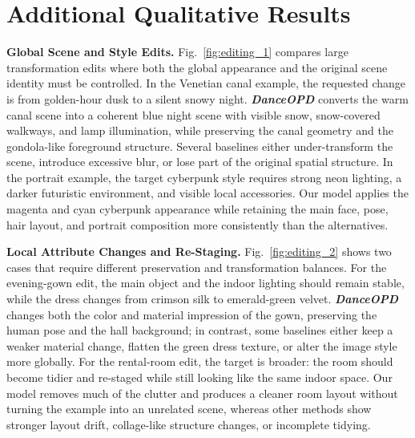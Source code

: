 \documentclass{llmxive}
\providecommand{\name}{\textsl{\textbf{DanceOPD}}\xspace}
\begin{document}
\begin{table}[!htbp]
\caption{\textbf{Timestep and Initialization Ablations.}
  Scores are GEditBench-EN sub-scores unless otherwise noted. Objective, teacher-schedule, dense-query, and rollout-control diagnostics are consolidated in Table~\ref{tab:multi-teacher-aggregation}. These ablations support semantic-side low-$t$ querying and the default initialization choice.}
\label{tab:ablation-summary}
\end{table}




\section{Additional Qualitative Results}
\label{app:additional-qualitative}

\noindent\textbf{Global Scene and Style Edits.}
Fig.~\ref{fig:editing_1} compares large transformation edits where both the global appearance and the original scene identity must be controlled. In the Venetian canal example, the requested change is from golden-hour dusk to a silent snowy night. \name{} converts the warm canal scene into a coherent blue night scene with visible snow, snow-covered walkways, and lamp illumination, while preserving the canal geometry and the gondola-like foreground structure. Several baselines either under-transform the scene, introduce excessive blur, or lose part of the original spatial structure. In the portrait example, the target cyberpunk style requires strong neon lighting, a darker futuristic environment, and visible local accessories. Our model applies the magenta and cyan cyberpunk appearance while retaining the main face, pose, hair layout, and portrait composition more consistently than the alternatives.


\noindent\textbf{Local Attribute Changes and Re-Staging.}
Fig.~\ref{fig:editing_2} shows two cases that require different preservation and transformation balances. For the evening-gown edit, the main object and the indoor lighting should remain stable, while the dress changes from crimson silk to emerald-green velvet. \name{} changes both the color and material impression of the gown, preserving the human pose and the hall background; in contrast, some baselines either keep a weaker material change, flatten the green dress texture, or alter the image style more globally. For the rental-room edit, the target is broader: the room should become tidier and re-staged while still looking like the same indoor space. Our model removes much of the clutter and produces a cleaner room layout without turning the example into an unrelated scene, whereas other methods show stronger layout drift, collage-like structure changes, or incomplete tidying.
\end{document}
